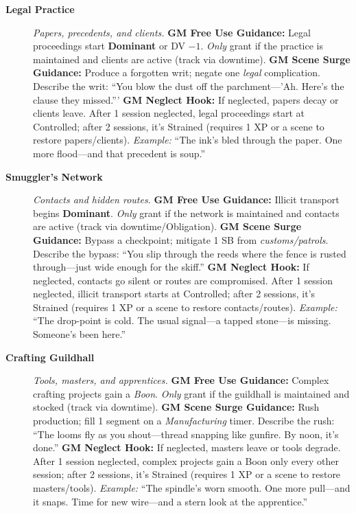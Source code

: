 \begin{description}
  \item[\textbf{Legal Practice}]   
        \emph{Papers, precedents, and clients.}  
        \textbf{GM Free Use Guidance:} Legal proceedings start \textbf{Dominant} or DV $-1$. \emph{Only} grant if the practice is maintained and clients are active (track via downtime).  
        \textbf{GM Scene Surge Guidance:} Produce a forgotten writ; negate one \emph{legal} complication. Describe the writ: ``You blow the dust off the parchment---'Ah. Here's the clause they missed.'''  
        \textbf{GM Neglect Hook:} If neglected, papers decay or clients leave. After 1 session neglected, legal proceedings start at Controlled; after 2 sessions, it's Strained (requires 1 XP or a scene to restore papers/clients).  
        \textit{Example:} ``The ink's bled through the paper. One more flood---and that precedent is soup.''  

  \item[\textbf{Smuggler's Network}]   
        \emph{Contacts and hidden routes.}  
        \textbf{GM Free Use Guidance:} Illicit transport begins \textbf{Dominant}. \emph{Only} grant if the network is maintained and contacts are active (track via downtime/Obligation).  
        \textbf{GM Scene Surge Guidance:} Bypass a checkpoint; mitigate 1 SB from \emph{customs/patrols}. Describe the bypass: ``You slip through the reeds where the fence is rusted through---just wide enough for the skiff.''  
        \textbf{GM Neglect Hook:} If neglected, contacts go silent or routes are compromised. After 1 session neglected, illicit transport starts at Controlled; after 2 sessions, it's Strained (requires 1 XP or a scene to restore contacts/routes).  
        \textit{Example:} ``The drop-point is cold. The usual signal---a tapped stone---is missing. Someone's been here.''  

  \item[\textbf{Crafting Guildhall}]   
        \emph{Tools, masters, and apprentices.}  
        \textbf{GM Free Use Guidance:} Complex crafting projects gain a \emph{Boon}. \emph{Only} grant if the guildhall is maintained and stocked (track via downtime).  
        \textbf{GM Scene Surge Guidance:} Rush production; fill 1 segment on a \emph{Manufacturing} timer. Describe the rush: ``The looms fly as you shout---thread snapping like gunfire. By noon, it's done.''  
        \textbf{GM Neglect Hook:} If neglected, masters leave or tools degrade. After 1 session neglected, complex projects gain a Boon only every other session; after 2 sessions, it's Strained (requires 1 XP or a scene to restore masters/tools).  
        \textit{Example:} ``The spindle's worn smooth. One more pull---and it snaps. Time for new wire---and a stern look at the apprentice.''  
\end{description}

